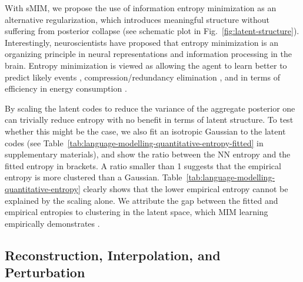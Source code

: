 \documentclass{article}
\begin{document}
With sMIM, we propose the use of information entropy minimization as an alternative regularization, 
which introduces meaningful structure without suffering from posterior collapse (see schematic plot in Fig.\ \ref{fig:latent-structure}).
Interestingly, neuroscientists have proposed that entropy minimization is an organizing principle in neural representations and information processing in the brain. 
Entropy minimization is viewed as allowing the agent to learn better to predict likely events \citep{Friston2010, Barlow1972}, 
compression/redundancy elimination \citep{Barlow1961},
and in terms of efficiency in energy consumption \citep{10.3389/fncom.2019.00086}.

By scaling the latent codes to reduce the variance of the aggregate posterior one can trivially reduce entropy with no benefit in terms of latent structure.
To test whether this might be the case, we also fit an isotropic Gaussian to the latent codes
(see Table\ \ref{tab:language-modelling-quantitative-entropy-fitted} in supplementary materials), 
and show the ratio between the NN entropy and the fitted entropy in brackets.
A ratio smaller than 1 suggests that the empirical entropy is more clustered than a Gaussian.
Table\ \ref{tab:language-modelling-quantitative-entropy} clearly shows that the lower empirical 
entropy cannot be explained by the scaling alone.
We attribute the gap between the fitted and empirical entropies to clustering in the latent space,  
which MIM learning empirically demonstrates \citep{2019arXiv191003175L}.

\subsection{Reconstruction, Interpolation, and Perturbation} \label{sec:nlp-recon}
\end{document}
